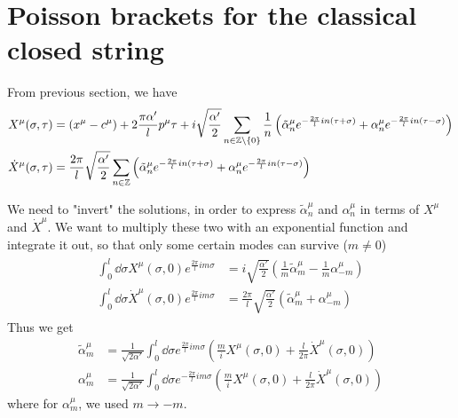 \clearpage
\section{Poisson brackets for the classical closed string}
From previous section, we have
\begin{align*}
	X^\mu (\sigma, \tau) &=  (x^\mu - c^\mu) + 2\frac{\pi \alpha'}{l} p^\mu \tau  + i \sqrt{\frac{\alpha'}{2}} \sum_{n \in \mathbb{Z} \setminus \{0\}} \frac{1}{n} \left( \tilde{\alpha}_n^\mu e^{-\frac{2\pi}{l} i n (\tau + \sigma)} + \alpha_n^\mu e^{-\frac{2\pi}{l} i n (\tau - \sigma)} \right)\\
	\dot{X}^\mu(\sigma, \tau) &= \frac{2\pi}{l} \sqrt{\frac{\alpha'}{2}} \sum_{n \in \mathbb{Z}} \left(  \tilde{\alpha}^\mu_n e^{- \frac{2\pi}{l} i n (\tau+\sigma)}  + {\alpha}^\mu_n e^{- \frac{2\pi}{l} i n (\tau - \sigma)}  \right)
\end{align*}

We need to "invert" the solutions, in order to express $\tilde\alpha^\mu_n$ and $\alpha^\mu_n$ in terms of $X^\mu$ and $\dot{X}^\mu$. We want to multiply these two with an exponential function and integrate it out, so that only some certain modes can survive ($m\neq 0$)
\begin{align}
	\begin{split}
		\int^l_0 \dd{\sigma} X^\mu (\sigma, 0) e^{\frac{2\pi}{l} im \sigma} &= i\sqrt{\frac{\alpha'}{2}} \left( \frac{1}{m} \tilde{\alpha}_m^\mu - \frac{1}{m} \alpha_{-m}^\mu \right) \\
		\int^l_0 \dd{\sigma} \dot{X}^\mu (\sigma, 0) e^{\frac{2\pi}{l} i m \sigma} &= \frac{2\pi}{l} \sqrt{\frac{\alpha'}{2}} \left( \tilde{\alpha}_m^\mu + \alpha_{-m}^\mu \right)
	\end{split}\label{math:Xint}
\end{align}
Thus we get
\begin{align}
	\tilde{\alpha}_m^\mu &= \frac{1}{\sqrt{2\alpha'}} \int_0^l \dd{\sigma} e^{\frac{2\pi}{l} im \sigma} \left( \frac{m}{i} X^\mu(\sigma,0) + \frac{l}{2\pi} \dot{X}^\mu(\sigma,0) \right) \\
	{\alpha}_m^\mu &= \frac{1}{\sqrt{2\alpha'}} \int_0^l \dd{\sigma} e^{-\frac{2\pi}{l} im \sigma} \left( \frac{m}{i} X^\mu(\sigma,0) + \frac{l}{2\pi} \dot{X}^\mu(\sigma,0) \right)
\end{align}
where for $\alpha_m^\mu$, we used $m \rightarrow -m$.

